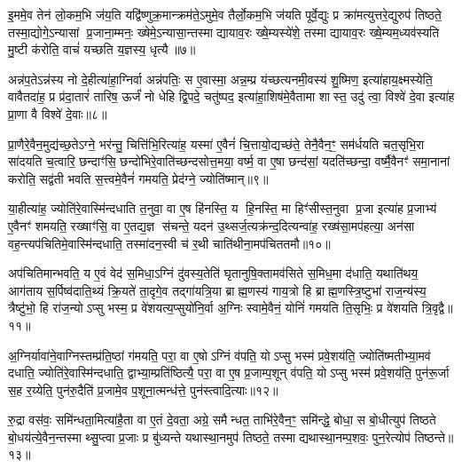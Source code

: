 इ॒ममे॒व तेन॑ लो॒कम॒भि ज॑य॒ति यद्वि॑ष्णुक्र॒मान्क्रम॑ते॒ऽमुमे॒व तैर्लो॒कम॒भि ज॑यति पूर्वे॒द्युः प्र क्रा॑मत्युत्तरे॒द्युरुप॑ तिष्ठते॒ तस्मा॒द्योगे॒ऽन्यासां प्र॒जाना॒म्मनः॒ ख्षेमे॒ऽन्यासा॒न्तस्माद्यायाव॒रः ख्षे॒म्यस्ये॑शे॒ तस्माद्यायाव॒रः ख्षे॒म्यम॒ध्यव॑स्यति मु॒ष्टी क॑रोति॒ वाचं॑ यच्छति य॒ज्ञस्य॒ धृत्यै॥७॥

{\anuvakamend[{सृ॒ष्टोऽभ्ये॑तया॑ भवति॒ सद्व॑त्युप॒तिष्ठ॑ते॒ द्विच॑त्वारिशच्च॥१॥}]}

अन्न॑प॒तेऽन्न॑स्य नो दे॒हीत्या॑हा॒ग्निर्वा अन्न॑पतिः॒ स ए॒वास्मा॒ अन्न॒म्प्र य॑च्छत्यनमी॒वस्य॑ शु॒ष्मिण॒ इत्या॑हाय॒क्ष्मस्येति॒ वावैतदा॑ह॒ प्र प्र॑दा॒तारं॑ तारिष॒ ऊर्जं॑ नो धेहि द्वि॒पदे॒ चतु॑ष्पद॒ इत्या॑हा॒शिष॑मे॒वैतामा शास्त॒ उदु॑ त्वा॒ विश्वे॑ दे॒वा इत्या॑ह प्रा॒णा वै विश्वे॑ दे॒वाः॥८॥

प्रा॒णैरे॒वैन॒मुद्य॑च्छ॒तेऽग्ने॒ भर॑न्तु॒ चित्ति॑भि॒रित्या॑ह॒ यस्मा॑ ए॒वैनं॑ चि॒त्तायो॒द्यच्छ॑ते॒ तेनै॒वैन॒ꣳ॒ सम॑र्धयति चत॒सृभि॒रा सा॑दयति च॒त्वारि॒ छन्दाꣳ॑सि॒ छन्दो॑भिरे॒वाति॑च्छन्दसोत्त॒मया॒ वर्ष्म॒ वा ए॒षा छन्द॑सां॒ यदति॑च्छन्दा॒ वर्ष्मै॒वैनꣳ॑ समा॒नानां करोति॒ सद्व॑ती भवति स॒त्त्वमे॒वैनं॑ गमयति॒ प्रेद॑ग्ने॒ ज्योति॑ष्मान्॥९॥

या॒हीत्या॑ह॒ ज्योति॑रे॒वास्मि॑न्दधाति त॒नुवा॒ वा ए॒ष हि॑नस्ति॒ य हि॒नस्ति॒ मा हिꣳ॑सीस्त॒नुवा प्र॒जा इत्या॑ह प्र॒जाभ्य॑ ए॒वैनꣳ॑ शमयति॒ रख्षाꣳ॑सि॒ वा ए॒तद्य॒ज्ञ स॑चन्ते॒ यदन॑ उ॒थ्सर्ज॒त्यक्र॑न्द॒दित्यन्वा॑ह॒ रख्ष॑सा॒मप॑हत्या॒ अन॑सा वह॒न्त्यप॑चितिमे॒वास्मि॑न्दधाति॒ तस्मा॑दन॒स्वी च॑ र॒थी चाति॑थीना॒मप॑चिततमौ॥१०॥

अप॑चितिमान्भवति॒ य ए॒वं वेद॑ स॒मिधा॒ऽग्निं दु॑वस्य॒तेति॑ घृतानुषि॒क्तामव॑सिते स॒मिध॒मा द॑धाति॒ यथाति॑थय॒ आग॑ताय स॒र्पिष्व॑दाति॒थ्यं क्रि॒यते॑ ता॒दृगे॒व तद्गा॑यत्रि॒या ब्राह्म॒णस्य॑ गाय॒त्रो हि ब्राह्म॒णस्त्रि॒ष्टुभा॑ राज॒न्य॑स्य॒ त्रैष्टु॑भो॒ हि रा॑ज॒न्योऽप्सु भस्म॒ प्र वे॑शयत्य॒प्सुयो॑नि॒र्वा अ॒ग्निः स्वामे॒वैनं॒ योनिं॑ गमयति ति॒सृभिः॒ प्र वे॑शयति त्रि॒वृद्वै॥११॥

अ॒ग्निर्यावा॑ने॒वाग्निस्तम्प्र॑ति॒ष्ठां ग॑मयति॒ परा॒ वा ए॒षोऽग्निं व॑पति॒ योऽप्सु भस्म॑ प्रवे॒शय॑ति॒ ज्योति॑ष्मतीभ्या॒मव॑ दधाति॒ ज्योति॑रे॒वास्मि॑न्दधाति॒ द्वाभ्या॒म्प्रति॑ष्ठित्यै॒ परा॒ वा ए॒ष प्र॒जाम्प॒शून् व॑पति॒ योऽप्सु भस्म॑ प्रवे॒शय॑ति॒ पुन॑रू॒र्जा स॒ह र॒य्येति॒ पुन॑रु॒दैति॑ प्र॒जामे॒व प॒शूना॒त्मन्ध॑त्ते॒ पुन॑स्त्वादि॒त्याः॥१२॥

रु॒द्रा वस॑वः॒ समि॑न्धता॒मित्या॑है॒ता वा ए॒तं दे॒वता॒ अग्रे॒ समैन्धत॒ ताभि॑रे॒वैन॒ꣳ॒ समि॑न्द्धे॒ बोधा॒ स बो॒धीत्युप॑ तिष्ठते बो॒धय॑त्ये॒वैन॒न्तस्माथ्सु॒प्त्वा प्र॒जाः प्र बु॑ध्यन्ते यथास्था॒नमुप॑ तिष्ठते॒ तस्माद्यथास्था॒नम्प॒शवः॒ पुन॒रेत्योप॑ तिष्ठन्ते॥१३॥

